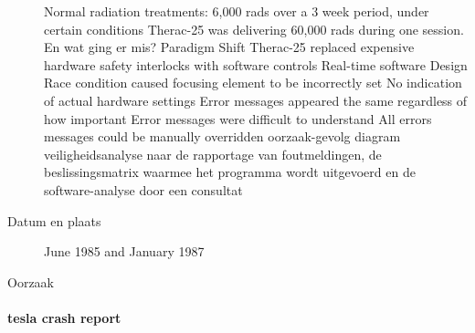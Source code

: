 \begin{description}
	Normal radiation treatments: 6,000 rads over a 3 week period, under certain conditions Therac-25 was delivering 60,000 rads during one session.
	En wat ging er mis?
	Paradigm Shift
	Therac-25 replaced expensive hardware safety interlocks with software controls
	Real-time software
	Design
	Race condition caused focusing element to be incorrectly set
	No indication of actual hardware settings
	Error messages appeared the same regardless of how important
	Error messages were difficult to understand
	All errors messages could be manually overridden
	oorzaak-gevolg diagram
	veiligheidsanalyse naar de rapportage van foutmeldingen, de beslissingsmatrix waarmee het programma wordt uitgevoerd en de software-analyse door een consultat
	\cite{stackexchange2021therac25code}
	
	\item[Datum en plaats] 
	June 1985 and January 1987
	\item[Oorzaak]
\end{description}






\paragraph{tesla crash report}

